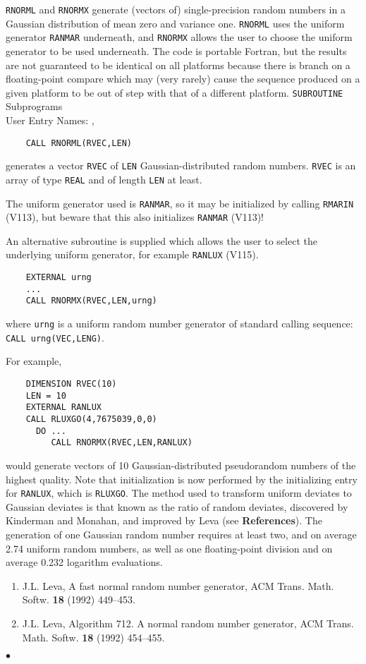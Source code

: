                       
             
\Submitter{}          
{\tt RNORML} and {\tt RNORMX} generate (vectors of)
single-precision random numbers in a Gaussian distribution of mean
zero and variance one. {\tt RNORML} uses the uniform generator
{\tt RANMAR} underneath, and {\tt RNORMX} allows the user
to choose the uniform generator to be used underneath.  The code
is portable Fortran, but the results are not guaranteed to be
identical on all platforms because there is branch on a floating-point
compare which may (very rarely) cause the sequence produced on a given
platform to be out of step with that of a different platform.
\Structure
{\tt SUBROUTINE} Subprograms\\
User Entry Names: , 
\Usage
\begin{verbatim}
    CALL RNORML(RVEC,LEN)
\end{verbatim}
generates a vector {\tt RVEC} of {\tt LEN} Gaussian-distributed
random numbers. {\tt RVEC} is an array of type {\tt REAL} and of
length {\tt LEN} at least.
\par
The uniform generator used is {\tt RANMAR},
so it may be initialized by calling {\tt RMARIN} (V113),
but beware that this also initializes {\tt RANMAR} (V113)!
\par
An alternative subroutine is supplied which allows the user to select
the underlying uniform generator, for example {\tt RANLUX} (V115).
\begin{verbatim}
    EXTERNAL urng
    ...
    CALL RNORMX(RVEC,LEN,urng)
\end{verbatim}
where {\tt urng} is a uniform random number generator of
standard calling sequence: {\tt CALL urng(VEC,LENG)}.
\par
For example,
\begin{verbatim}
    DIMENSION RVEC(10)
    LEN = 10
    EXTERNAL RANLUX
    CALL RLUXGO(4,7675039,0,0)
      DO ...
         CALL RNORMX(RVEC,LEN,RANLUX)
\end{verbatim}
would generate vectors of 10 Gaussian-distributed pseudorandom numbers
of the highest quality.  Note that initialization is now performed by
the initializing entry for {\tt RANLUX}, which is {\tt RLUXGO}.
\Method
  The method used to transform uniform deviates to Gaussian deviates
is that known as the ratio of random deviates, discovered by Kinderman
and Monahan, and improved by Leva (see {\bf References}).
The generation of one
Gaussian random number requires at least two, and on average 2.74 uniform
random numbers, as well as one floating-point division and on average
0.232 logarithm evaluations.
\newpage
\Refer
\begin{enumerate}
\item J.L. Leva, A fast normal random number generator,
ACM Trans. Math. Softw. {\bf 18} (1992) 449--453.
\item J.L. Leva, Algorithm 712. A normal random number generator,
ACM Trans. Math. Softw. {\bf 18} (1992) 454--455.
\end{enumerate}
$\bullet$
